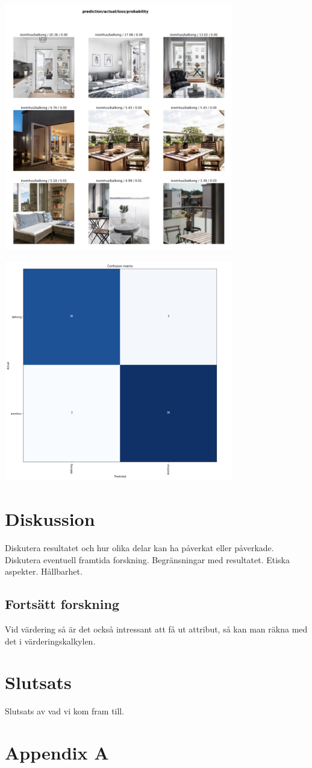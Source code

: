 \documentclass{kththesis}
\begin{document}
\includegraphics[width=10cm]{../images/3.png}

\includegraphics[width=10cm]{../images/4.png}

\chapter{Diskussion}
Diskutera resultatet och hur olika delar kan ha påverkat eller påverkade. Diskutera eventuell framtida forskning. Begränsningar med resultatet.
Etiska aspekter. Hållbarhet. 

  \section{Fortsätt forskning}
  Vid värdering så är det också intressant att få ut attribut, så kan man räkna med det i värderingskalkylen.

\chapter{Slutsats}  
Slutsats av vad vi kom fram till.

\printbibliography[heading=bibintoc]
\appendix
  \chapter{Appendix A}

\tailmatter
\end{document}
